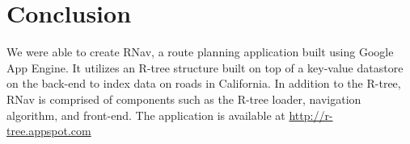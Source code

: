 \documentclass{scrartcl}
\begin{document}
\section{Conclusion}
We were able to create RNav, a route planning application built using Google App Engine. It utilizes an R-tree structure built on top of a key-value datastore on the back-end to index data on roads in California. In addition to the R-tree, RNav is comprised of components such as the R-tree loader, navigation algorithm, and front-end. The application is available at \url{http://r-tree.appspot.com}



\end{document}

